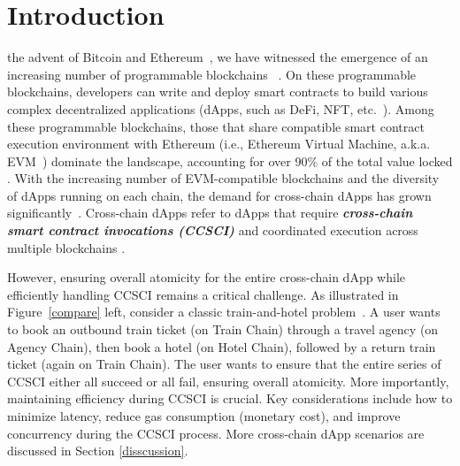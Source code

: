 \section{Introduction} 

 the advent of Bitcoin and Ethereum~\cite{bitcoin,eth}, 
we have witnessed the emergence of an increasing number of programmable blockchains
~\cite{belchior2021pastSV,wang2023SV,huang2021survey,lohachab2021SV}. 
On these programmable blockchains, developers can write and deploy smart contracts to build various complex decentralized applications (dApps, such as DeFi, NFT, etc.~\cite{wenkai2022defiSV,nadini2021mapping}).
Among these programmable blockchains, those that share compatible smart contract execution environment with Ethereum (i.e., Ethereum Virtual Machine, a.k.a. EVM~\cite{ethereum_evm}) dominate the landscape, accounting for over 90\% of the total value locked \cite{chaintvl}. 
With the increasing number of EVM-compatible blockchains and the diversity of dApps running on each chain, the demand for cross-chain dApps has grown significantly~\cite{OU2022OV}. 
Cross-chain dApps refer to dApps that require \emph{\textbf{cross-chain smart contract invocations \emph{(}CCSCI\emph{)}}} and coordinated execution across multiple blockchains \cite{Falazi2024crosschain}.

However, ensuring overall atomicity for the entire cross-chain dApp while efficiently handling CCSCI remains a critical challenge. 
As illustrated in Figure~\ref{compare} left, 
consider a classic train-and-hotel problem~\cite{train}. 
A user wants to book an outbound train ticket (on Train Chain) through a travel agency (on Agency Chain), then book a hotel (on Hotel Chain), followed by a return train ticket (again on Train Chain). 
The user wants to ensure that the entire series of CCSCI either all succeed or all fail, ensuring overall atomicity.
More importantly, maintaining efficiency during CCSCI is crucial. 
Key considerations include how to minimize latency, reduce gas consumption (monetary cost), and improve concurrency during the CCSCI process.
More cross-chain dApp scenarios are discussed in Section \ref{disscussion}.

